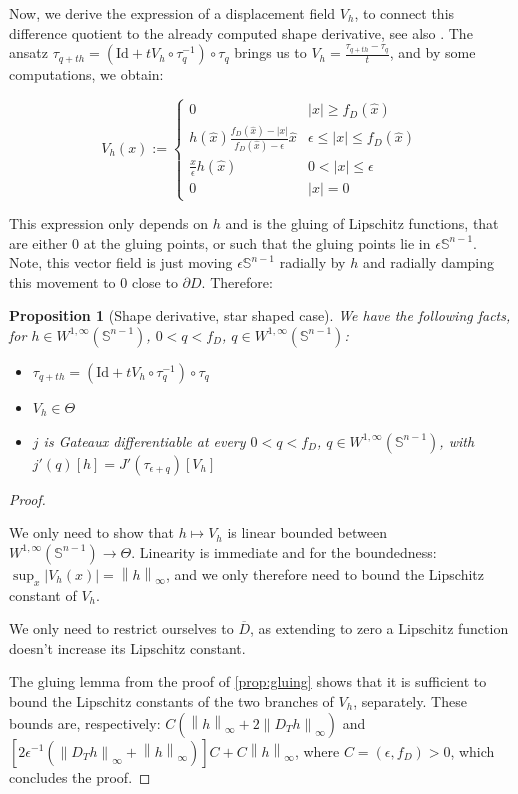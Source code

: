 \documentclass[english,a4paper,9pt,oneside]{scrbook}	%
\theoremstyle{break}
\newtheorem{prop}[equation]{Proposition}
\newenvironment{mproof}[1][\proofname]{%
  \begin{proof}[#1]$ $\par\nobreak\ignorespaces
}{%
  \end{proof}
}
\renewcommand*{\proofname}{Proof}
\theoremstyle{remark}
\newcommand{\mS}{\mathbb{S}^{n-1}}
\newcommand{\ds}{\displaystyle}
\newcommand{\norm}[1]{\left\lVert#1\right\rVert}
\newcommand{\id}{\text{Id}}
\newcommand{\Te}{\Theta}
\newcommand{\xh}{\hat{x}}
\newcommand{\eps}{\epsilon}
\begin{document}
Now, we derive the expression of a displacement field $V_h$, to connect this difference quotient to the already computed shape derivative, see also \cite{deckelnick}. The ansatz $\tau_{q+th}=(\id + tV_h\circ \tau_q^{-1})\circ \tau_q$ brings us to $V_h = \ds \frac{\tau_{q+th}-\tau_q}{t}$, and by some computations, we obtain: 

$$V_h(x) :=\left\{\begin{matrix}
 0 & |x|\geq f_D(\xh)\\ 
 h(\xh)\frac{f_D(\xh)-|x|}{f_D(\xh)-\eps}\xh & \eps \leq |x| \leq f_D(\xh) \\ 
 \frac{x}{\epsilon}h(\hat{x}) & 0<|x|\leq \eps\\ 
 0 & |x|=0
\end{matrix}\right.$$

This expression only depends on $h$ and is the gluing of Lipschitz functions, that are either $0$ at the gluing points, or such that the gluing points lie in $\eps\mS$. Note, this vector field is just moving $\eps \mS$ radially by $h$ and radially damping this movement to $0$ close to $\partial D$. Therefore:

\begin{prop}[Shape derivative, star shaped case]
\label{prop:star_shaped_gradient}
We have the following facts, for $h \in W^{1,\infty}(\mS)$, $0<q<f_D$, $q \in W^{1,\infty}(\mS)$:

\begin{itemize}
	\item $\tau_{q+th}=(\id + tV_h\circ \tau_q^{-1})\circ \tau_q$
	\item $V_h \in \Te$
	\item $j$ is Gateaux differentiable at every $0<q<f_D$, $q \in W^{1,\infty}(\mS)$, with $j'(q)[h] = J'(\tau_{\eps+q})[V_h]$
\end{itemize}

\end{prop}
\begin{mproof}

We only need to show that $h\mapsto V_h$ is linear bounded between $W^{1,\infty}(\mS)\rightarrow \Te$. Linearity is immediate and for the boundedness: $\sup_x|V_h(x)| = \norm{h}_\infty$, and we only therefore need to bound the Lipschitz constant of $V_h$. 

We only need to restrict ourselves to $\overline{D}$, as extending to zero a Lipschitz function doesn't increase its Lipschitz constant.

The gluing lemma from the proof of \cref{prop:gluing} shows that it is sufficient to bound the Lipschitz constants of the two branches of $V_h$, separately.
These bounds are, respectively: $C(\norm{h}_\infty + 2\norm{D_T h}_\infty)$ and $[2\eps^{-1}(\norm{D_T h}_\infty + \norm{h}_\infty)]C+C\norm{h}_\infty$, where $C=(\eps, f_D)>0$, which concludes the proof.
\end{mproof}
\end{document}
